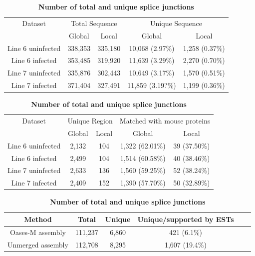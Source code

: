 \documentclass[10pt]{article}
\begin{document}
\begin{table}[!ht]
\caption{
\bf{Unique sequences from global and local assembly}}
\begin{tabular}{ccccc}
\hline
Dataset & \multicolumn{2}{c}{Total Sequence} & \multicolumn{2}{c}{Unique Sequence}\\
 & Global & Local & Global & Local\\
\hline
Line 6 uninfected & 338,353 & 335,180 & 10,068 (2.97\%) & 1,258 (0.37\%)\\
Line 6 infected & 353,485 & 319,920 & 11,639 (3.29\%)& 2,270 (0.70\%)\\
Line 7 uninfected & 335,876 & 302,443 & 10,649 (3.17\%) & 1,570 (0.51\%)\\
Line 7 infected & 371,404 & 327,491 & 11,859 (3.19?\%)& 1,199 (0.36\%)\\
\hline
\end{tabular}
\label{unique_sequences}

\caption{
\bf{Unique regions from global and local assembly}}
\begin{tabular}{ccccc}
\hline
Dataset & \multicolumn{2}{c}{Unique Region} & \multicolumn{2}{c}{Matched with mouse proteins}\\
 & Global & Local & Global & Local\\
\hline
Line 6 uninfected & 2,132 & 104 & 1,322 (62.01\%) & 39 (37.50\%)\\
Line 6 infected & 2,499 & 104 & 1,514 (60.58\%)& 40 (38.46\%)\\
Line 7 uninfected & 2,633 & 136 & 1,560 (59.25\%) & 52 (38.24\%)\\
Line 7 infected & 2,409 & 152 & 1,390 (57.70\%)& 50 (32.89\%)\\
\hline
\end{tabular}
\label{unique_sequences_matched_mouse}

\caption{
\bf{Number of total and unique splice junctions}}
\begin{tabular}{cccccc}
\hline
Method& Total & Unique & Unique/supported by ESTs \\ 
\hline
Oases-M assembly & 111,237 & 6,860 & 421 (6.1\%) \\
Unmerged assembly & 112,708 & 8,295 & 1,607 (19.4\%) \\
\hline
\end{tabular}
\label{Oases-M}


\end{table}
\end{document}
